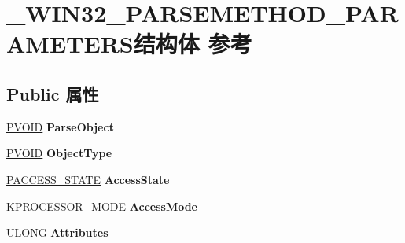 \hypertarget{struct___w_i_n32___p_a_r_s_e_m_e_t_h_o_d___p_a_r_a_m_e_t_e_r_s}{}\section{\+\_\+\+W\+I\+N32\+\_\+\+P\+A\+R\+S\+E\+M\+E\+T\+H\+O\+D\+\_\+\+P\+A\+R\+A\+M\+E\+T\+E\+R\+S结构体 参考}
\label{struct___w_i_n32___p_a_r_s_e_m_e_t_h_o_d___p_a_r_a_m_e_t_e_r_s}
\subsection*{Public 属性}
\begin{DoxyCompactItemize}
\item 
\mbox{\label{struct___w_i_n32___p_a_r_s_e_m_e_t_h_o_d___p_a_r_a_m_e_t_e_r_s_ab79ca6e4064851d3a63e83ce6d58e968}} 
\hyperlink{interfacevoid}{P\+V\+O\+ID} {\bfseries Parse\+Object}
\item 
\mbox{\label{struct___w_i_n32___p_a_r_s_e_m_e_t_h_o_d___p_a_r_a_m_e_t_e_r_s_a9621df8fccc4fda397e750bfc6c4e89e}} 
\hyperlink{interfacevoid}{P\+V\+O\+ID} {\bfseries Object\+Type}
\item 
\mbox{\label{struct___w_i_n32___p_a_r_s_e_m_e_t_h_o_d___p_a_r_a_m_e_t_e_r_s_a1cf2d5923a036cf6f85fdedf741bf0ab}} 
\hyperlink{struct___a_c_c_e_s_s___s_t_a_t_e}{P\+A\+C\+C\+E\+S\+S\+\_\+\+S\+T\+A\+TE} {\bfseries Access\+State}
\item 
\mbox{\label{struct___w_i_n32___p_a_r_s_e_m_e_t_h_o_d___p_a_r_a_m_e_t_e_r_s_adbc2886db90679d49ecf7e07f6707131}} 
K\+P\+R\+O\+C\+E\+S\+S\+O\+R\+\_\+\+M\+O\+DE {\bfseries Access\+Mode}
\item 
\mbox{\label{struct___w_i_n32___p_a_r_s_e_m_e_t_h_o_d___p_a_r_a_m_e_t_e_r_s_a90662dddb502f9d92981f07e6240e276}} 
U\+L\+O\+NG {\bfseries Attributes}
\item 

\end{DoxyCompactItemize}
